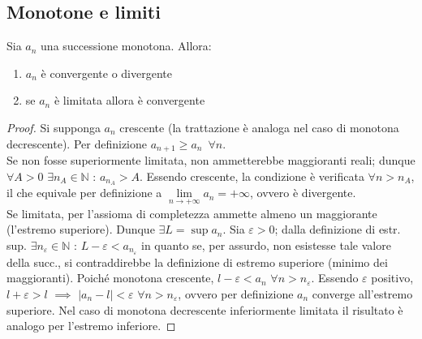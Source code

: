 \documentclass[10pt, oneside]{book}
\theoremstyle{plain}
\begin{document}
\subsection{Monotone e limiti}
\begin{ther}
    Sia $a_n$ una successione monotona. Allora:
    \begin{enumerate}
        \item $a_n$ è convergente o divergente
        \item se $a_n$ è limitata allora è convergente
    \end{enumerate}
\end{ther}
\begin{proof}
    Si supponga $a_n$ crescente (la trattazione è analoga nel caso di monotona decrescente). Per definizione $a_{n+1} \geq a_n \enspace \forall n$. 
    \\Se non fosse superiormente limitata, non ammetterebbe maggioranti reali; dunque $\forall A > 0$ $\exists n_A \in \mathbb{N}$ : $a_{n_A} > A$. Essendo crescente, la condizione è verificata $\forall n > n_A$, il che equivale per definizione a $\lim \limits_{n \rightarrow +\infty} a_n = +\infty$, ovvero è divergente.
    \\Se limitata, per l'assioma di completezza ammette almeno un maggiorante (l'estremo superiore). Dunque $\exists L = \sup a_n$. Sia $\varepsilon > 0$; dalla definizione di estr. sup. $\exists n_\varepsilon \in \mathbb{N}$ : $L - \varepsilon < a_{n_\varepsilon}$ in quanto se, per assurdo, non esistesse tale valore della succ., si contraddirebbe la definizione di estremo superiore (minimo dei maggioranti). Poiché monotona crescente, $l - \varepsilon < a_n$ $\forall n > n_\varepsilon$. Essendo $\varepsilon$ positivo, $l + \varepsilon > l$ $\implies$ $|a_n - l| < \varepsilon$ $\forall n > n_\varepsilon$, ovvero per definizione $a_n$ converge all'estremo superiore. Nel caso di monotona decrescente inferiormente limitata il risultato è analogo per l'estremo inferiore.
\end{proof}
\end{document}
